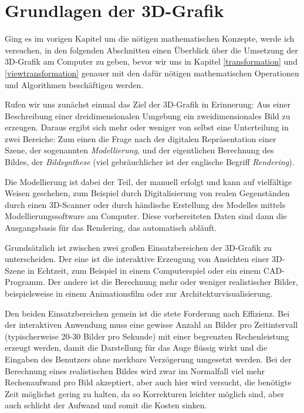 \chapter{Grundlagen der 3D-Grafik}
Ging es im vorigen Kapitel um die nötigen mathematischen Konzepte, werde ich versuchen, in den folgenden Abschnitten einen Überblick über die Umsetzung der 3D-Grafik am Computer zu geben, bevor wir uns in Kapitel \ref{transformation} und \ref{viewtransformation} genauer mit den dafür nötigen mathematischen Operationen und Algorithmen beschäftigen werden.

Rufen wir uns zunächst einmal das Ziel der 3D-Grafik in Erinnerung: Aus einer Beschreibung einer dreidimensionalen Umgebung ein zweidimensionales Bild zu erzeugen. Daraus ergibt sich mehr oder weniger von selbst eine Unterteilung in zwei Bereiche: Zum einen die Frage nach der digitalen Repräsentation einer Szene, der sogenannten \emph{Modellierung}, und der eigentlichen Berechnung des Bildes, der \emph{Bildsynthese} (viel gebräuchlicher ist der englische Begriff \emph{Rendering}).

Die Modellierung ist dabei der Teil, der manuell erfolgt und kann auf vielfältige Weisen geschehen, zum Beispiel durch Digitalisierung von realen Gegenständen durch einen 3D-Scanner oder durch händische Erstellung des Modelles mittels Modellierungssoftware am Computer. Diese vorbereiteten Daten sind dann die Ausgangsbasis für das Rendering, das automatisch abläuft.

Grundsätzlich ist zwischen zwei großen Einsatzbereichen der 3D-Grafik zu unterscheiden. Der eine ist die interaktive Erzeugung von Ansichten einer 3D-Szene in Echtzeit, zum Beispiel in einem Computerspiel oder ein einem CAD-Programm. Der andere ist die Berechnung mehr oder weniger realistischer Bilder, beispielsweise in einem Animationsfilm oder zur Architekturvisualisierung.

Den beiden Einsatzbereichen gemein ist die stete Forderung nach Effizienz. Bei der interaktiven Anwendung muss eine gewisse Anzahl an Bilder pro Zeitintervall (typischerweise 20-30 Bilder pro Sekunde) mit einer begrenzten Rechenleistung erzeugt werden, damit die Darstellung für das Auge flüssig wirkt und die Eingaben des Benutzers ohne merkbare Verzögerung umgesetzt werden. Bei der Berechnung eines realistischen Bildes wird zwar im Normalfall viel mehr Rechenaufwand pro Bild akzeptiert, aber auch hier wird versucht, die benötigte Zeit möglichst gering zu halten, da so Korrekturen leichter möglich sind, aber auch schlicht der Aufwand und somit die Kosten sinken.

